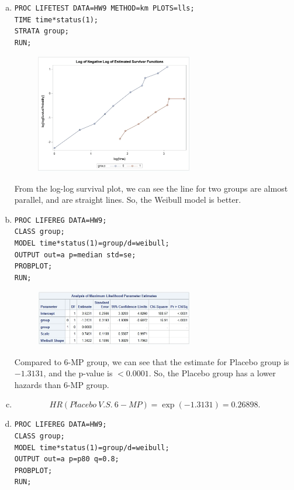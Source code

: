 \documentclass{elegantbook}
\begin{document}
\begin{solution}
    \begin{enumerate}[(a)]
        \item \begin{verbatim}
PROC LIFETEST DATA=HW9 METHOD=km PLOTS=lls;
TIME time*status(1);
STRATA group;
RUN;
        \end{verbatim}
        \begin{figure}[H]
            \centering
            \includegraphics[width=0.65\textwidth]{HW9_3a.png}
        \end{figure}
        From the log-log survival plot, we can see the line for two groups are almost parallel, and are straight lines. So, the Weibull model is better. 
    \item \begin{verbatim}
PROC LIFEREG DATA=HW9;
CLASS group;
MODEL time*status(1)=group/d=weibull;
OUTPUT out=a p=median std=se;
PROBPLOT;
RUN;
        \end{verbatim}
        \begin{figure}[H]
            \centering
            \includegraphics[width=0.65\textwidth]{HW9_3b.png}
        \end{figure}
        Compared to 6-MP group, we can see that the estimate for Placebo group is $-1.3131$, and the p-value is $<0.0001$. So, the Placebo group has a lower hazards than 6-MP group. 
        \item \[HR(Placebo\ V.S.\ 6-MP)=\exp(-1.3131)=0.26898. \]
        \item \begin{verbatim}
PROC LIFEREG DATA=HW9;
CLASS group;
MODEL time*status(1)=group/d=weibull;
OUTPUT out=a p=p80 q=0.8;
PROBPLOT;
RUN;


\end{verbatim}
\end{enumerate}
\end{solution}
\end{document}
